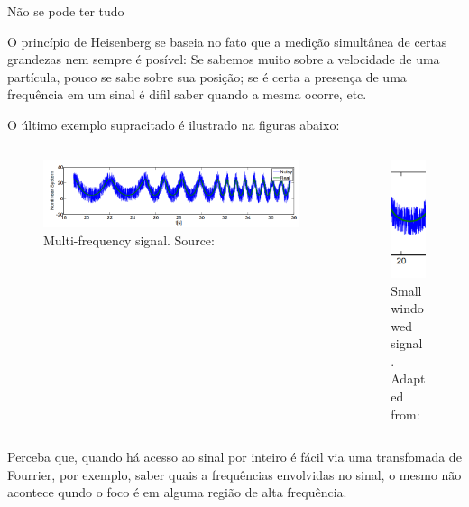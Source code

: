 	\begin{frame}[allowframebreaks]{Não se pode ter tudo}
		\par O princípio de Heisenberg se baseia no fato que a medição simultânea de certas grandezas nem sempre é posível: Se sabemos muito sobre a velocidade de uma partícula, pouco se sabe sobre sua posição; se é certa a presença de uma frequência em um sinal é difil saber quando a mesma ocorre, etc.
		\par O último exemplo supracitado é ilustrado na figuras abaixo:
		
		\begin{columns}
			\begin{column}{0.5\textwidth}
				\begin{figure}[h]
					\centering
					\includegraphics[width=1\linewidth]{../text/images/noisySignal}
					\caption[Multi-frequency signal]{Multi-frequency signal. Source: \cite{olama2011design}}
					\label{fig:noisysignal}
				\end{figure}
			\end{column}
			\begin{column}{0.5\textwidth}
					\begin{figure}[h]
						\centering
						\includegraphics[width=0.1\linewidth]{../text/images/windowedNoisySignal}
						\caption[Windowed signal]{Small windowed signal. Adapted from: \cite{olama2011design}}
						\label{fig:windowednoisysignal}
					\end{figure}
			\end{column}
		\end{columns}
		\par Perceba que, quando há acesso ao sinal por inteiro é fácil via uma transfomada de Fourrier, por exemplo, saber quais a frequências envolvidas no sinal, o mesmo não acontece qundo o foco é em alguma região de alta frequência.		
	\end{frame}

